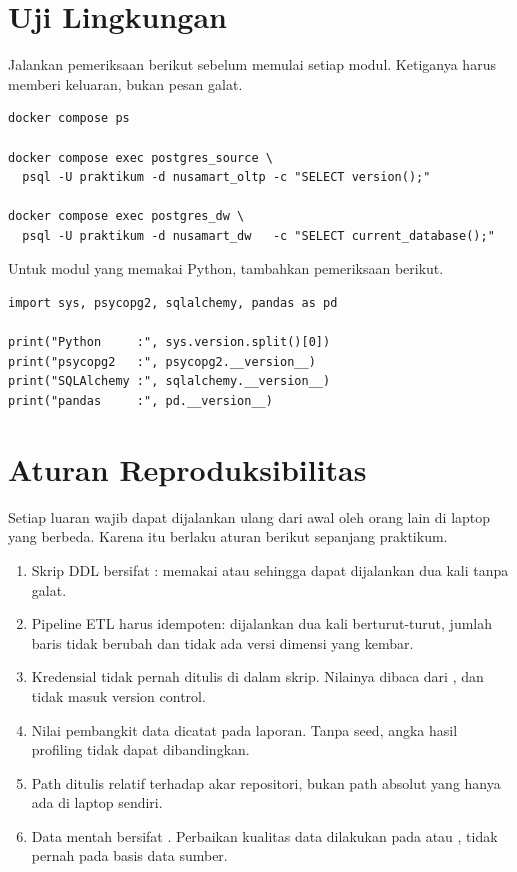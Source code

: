 \section{Uji Lingkungan}

Jalankan pemeriksaan berikut sebelum memulai setiap modul. Ketiganya harus
memberi keluaran, bukan pesan galat.

\begin{lstlisting}[style=shellgaya]
docker compose ps

docker compose exec postgres_source \
  psql -U praktikum -d nusamart_oltp -c "SELECT version();"

docker compose exec postgres_dw \
  psql -U praktikum -d nusamart_dw   -c "SELECT current_database();"
\end{lstlisting}

Untuk modul yang memakai Python, tambahkan pemeriksaan berikut.

\begin{lstlisting}[style=pythongaya]
import sys, psycopg2, sqlalchemy, pandas as pd

print("Python     :", sys.version.split()[0])
print("psycopg2   :", psycopg2.__version__)
print("SQLAlchemy :", sqlalchemy.__version__)
print("pandas     :", pd.__version__)
\end{lstlisting}

\section{Aturan Reproduksibilitas}

Setiap luaran wajib dapat dijalankan ulang dari awal oleh orang lain di laptop
yang berbeda. Karena itu berlaku aturan berikut sepanjang praktikum.

\begin{enumerate}[leftmargin=1.4em]
  \item Skrip DDL bersifat : memakai
         atau 
        sehingga dapat dijalankan dua kali tanpa galat.
  \item Pipeline ETL harus idempoten: dijalankan dua kali berturut-turut, jumlah
        baris tidak berubah dan tidak ada versi dimensi yang kembar.
  \item Kredensial tidak pernah ditulis di dalam skrip. Nilainya dibaca dari
        \berkas{.env}, dan \berkas{.env} tidak masuk version control.
  \item Nilai \perintah{--seed} pembangkit data dicatat pada laporan. Tanpa
        seed, angka hasil profiling tidak dapat dibandingkan.
  \item Path ditulis relatif terhadap akar repositori, bukan path absolut yang
        hanya ada di laptop sendiri.
  \item Data mentah bersifat \istilah{read-only}. Perbaikan kualitas data
        dilakukan pada  atau , tidak pernah
        pada basis data sumber.
\end{enumerate}

